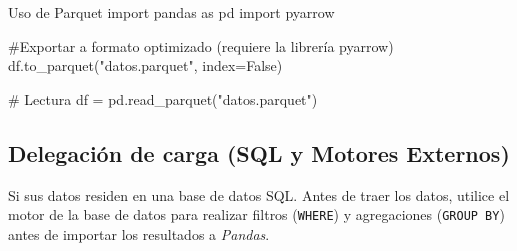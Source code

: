 \begin{pycode}{Uso de Parquet}
import pandas as pd
import pyarrow

#Exportar a formato optimizado (requiere la librería pyarrow)
df.to_parquet("datos.parquet", index=False)

# Lectura 
df = pd.read_parquet("datos.parquet")
\end{pycode}

\subsection{Delegación de carga (SQL y Motores Externos)}

Si sus datos residen en una base de datos SQL. Antes de traer los datos, utilice el motor de la base de datos para realizar filtros (\texttt{WHERE}) y agregaciones (\texttt{GROUP BY}) antes de importar los resultados a \textit{Pandas}.